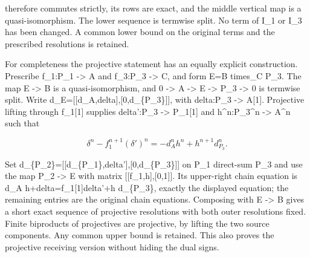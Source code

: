 therefore commutes strictly,\allowbreak{} its rows are exact,\allowbreak{} and the middle vertical map is a quasi-isomorphism. The lower sequence is termwise split. No term of I\_\allowbreak{}1 or I\_\allowbreak{}3 has been changed. A common lower bound on the original terms and the prescribed resolutions is retained.

For completeness the projective statement has an equally explicit construction. Prescribe f\_\allowbreak{}1:\allowbreak{}P\_\allowbreak{}1 \allowbreak{}-> A and f\_\allowbreak{}3:\allowbreak{}P\_\allowbreak{}3 \allowbreak{}-> C,\allowbreak{} and form E\allowbreak{}=B times\_\allowbreak{}C P\_\allowbreak{}3. The map E \allowbreak{}-> B is a quasi-isomorphism,\allowbreak{} and 0 \allowbreak{}-> A \allowbreak{}-> E \allowbreak{}-> P\_\allowbreak{}3 \allowbreak{}-> 0 is termwise split. Write d\_\allowbreak{}E\allowbreak{}=[[d\_\allowbreak{}A,\allowbreak{}delta]\allowbreak{},\allowbreak{}[0,\allowbreak{}d\_\allowbreak{}\{P\_\allowbreak{}3\}]\allowbreak{}]\allowbreak{},\allowbreak{} with delta:\allowbreak{}P\_\allowbreak{}3 \allowbreak{}-> A[1]\allowbreak{}. Projective lifting through f\_\allowbreak{}1[1]\allowbreak{} supplies delta':\allowbreak{}P\_\allowbreak{}3 \allowbreak{}-> P\_\allowbreak{}1[1]\allowbreak{} and h\textasciicircum{}n:\allowbreak{}P\_\allowbreak{}3\textasciicircum{}n \allowbreak{}-> A\^{}n such that

\[
 \delta^n-f_1^{n+1}(\delta')^n
              =-d_A^n h^n+h^{n+1}d_{P_3}^n.
\]

Set d\_\allowbreak{}\{P\_\allowbreak{}2\}\allowbreak{}=[[d\_\allowbreak{}\{P\_\allowbreak{}1\},\allowbreak{}delta']\allowbreak{},\allowbreak{}[0,\allowbreak{}d\_\allowbreak{}\{P\_\allowbreak{}3\}]\allowbreak{}]\allowbreak{} on P\_\allowbreak{}1 direct-sum P\_\allowbreak{}3 and use the map P\_\allowbreak{}2 \allowbreak{}-> E with matrix [[f\_\allowbreak{}1,\allowbreak{}h]\allowbreak{},\allowbreak{}[0,\allowbreak{}1]\allowbreak{}]\allowbreak{}. Its upper-right chain equation is d\_\allowbreak{}A h\allowbreak{}+delta\allowbreak{}=f\_\allowbreak{}1[1]\allowbreak{}delta'\allowbreak{}+h d\_\allowbreak{}\{P\_\allowbreak{}3\},\allowbreak{} exactly the displayed equation; the remaining entries are the original chain equations. Composing with E \allowbreak{}-> B gives a short exact sequence of projective resolutions with both outer resolutions fixed. Finite biproducts of projectives are projective,\allowbreak{} by lifting the two source components. Any common upper bound is retained. This also proves the projective receiving version without hiding the dual signs.

